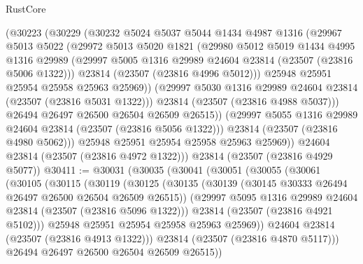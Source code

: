 \begin{lexlean}{RustCore}
\begin{coremodule}
            (@30223
              (@30229
                (@30232
                  @5024
                  @5037
                  @5044
                  @1434
                  @4987
                  @1316
                  (@29967
                    @5013
                    @5022
                    (@29972
                      @5013
                      @5020
                      @1821
                      (@29980
                        @5012
                        @5019
                        @1434
                        @4995
                        @1316
                        @29989
                        (@29997 @5005 @1316 @29989 @24604 @23814 (@23507 (@23816 @5006 @1322)))
                        @23814
                        (@23507 (@23816 @4996 @5012)))
                      @25948
                      @25951
                      @25954
                      @25958
                      @25963
                      @25969))
                  (@29997 @5030 @1316 @29989 @24604 @23814 (@23507 (@23816 @5031 @1322)))
                  @23814
                  (@23507 (@23816 @4988 @5037)))
                @26494
                @26497
                @26500
                @26504
                @26509
                @26515))
            (@29997 @5055 @1316 @29989 @24604 @23814 (@23507 (@23816 @5056 @1322)))
            @23814
            (@23507 (@23816 @4980 @5062)))
          @25948
          @25951
          @25954
          @25958
          @25963
          @25969))
      @24604
      @23814
      (@23507 (@23816 @4972 @1322)))
    @23814
    (@23507 (@23816 @4929 @5077))
@30411 := @30031
    (@30035
      (@30041
        (@30051
          (@30055
            (@30061
              (@30105
                (@30115
                  (@30119
                    (@30125
                      (@30135
                        (@30139 (@30145 @30333 @26494 @26497 @26500 @26504 @26509 @26515))
                        (@29997 @5095 @1316 @29989 @24604 @23814 (@23507 (@23816 @5096 @1322)))
                        @23814
                        (@23507 (@23816 @4921 @5102)))
                      @25948
                      @25951
                      @25954
                      @25958
                      @25963
                      @25969))
                  @24604
                  @23814
                  (@23507 (@23816 @4913 @1322)))
                @23814
                (@23507 (@23816 @4870 @5117)))
              @26494
              @26497
              @26500
              @26504
              @26509
              @26515))

\end{coremodule}
\end{lexlean}
